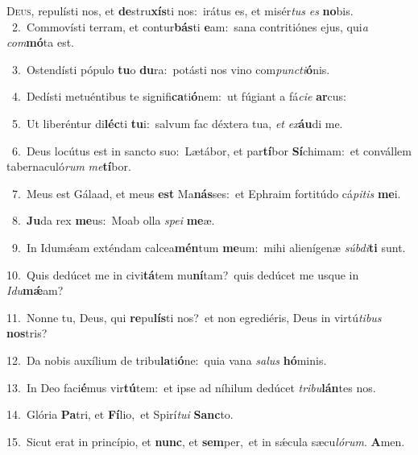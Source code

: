 \lettrine{\initial\textcolor{\initialcolor}{D}}{eus,} repulísti nos, et \textbf{de}\-stru\-\textbf{xís}\-ti nos:~\star irátus es, et misér\textit{tus} \textit{es} \textbf{no}\-bis.\\
{\numbfont\textcolor{\numbcolor}{~2.}}~Commovísti terram, et contur\-\textbf{bás}\-ti \textbf{e}\-am:~\star sana contritiónes ejus, qui\textit{a} \textit{com}\-\textbf{mó}ta est.\par
{\numbfont\textcolor{\numbcolor}{~3.}}~Ostendísti pópulo \textbf{tu}\-o \textbf{du}\-ra:~\star potásti nos vino com\-\textit{punc}\-\textit{ti}\textbf{ó}nis.\par
{\numbfont\textcolor{\numbcolor}{~4.}}~Dedísti metuéntibus te signifi\-\textbf{ca}\-ti\-\textbf{ó}\-nem:~\star ut fúgiant a fá\-\textit{ci}\-\textit{e} \textbf{ar}\-cus:\par
{\numbfont\textcolor{\numbcolor}{~5.}}~Ut liberéntur di\-\textbf{léc}\-ti \textbf{tu}\-i:~\star salvum fac déxtera tua, \textit{et} \textit{ex}\-\textbf{áu}di me.\par
{\numbfont\textcolor{\numbcolor}{~6.}}~Deus locútus est in sancto suo:~\dagger Lætábor, et par\-\textbf{tí}\-bor \textbf{Sí}\-chimam:~\star et convállem tabernaculó\textit{rum} \textit{me}\-\textbf{tí}bor.\par
{\numbfont\textcolor{\numbcolor}{~7.}}~Meus est Gálaad, et meus \textbf{est} Ma\-\textbf{nás}\-ses:~\star et Ephraim fortitúdo cá\-\textit{pi}\-\textit{tis} \textbf{me}\-i.\par
{\numbfont\textcolor{\numbcolor}{~8.}}~\-\textbf{Ju}\-da rex \textbf{me}\-us:~\star Moab olla \textit{spe}\-\textit{i} \textbf{me}\-æ.\par
{\numbfont\textcolor{\numbcolor}{~9.}}~In Idumǽam exténdam calcea\-\textbf{mén}\-tum \textbf{me}\-um:~\star mihi alienígenæ \textit{súb}\-\textit{di}\textbf{ti} sunt.\par
{\numbfont\textcolor{\numbcolor}{10.}}~Quis dedúcet me in civi\-\textbf{tá}\-tem mu\-\textbf{ní}\-tam?~\star quis dedúcet me usque in \textit{I}\-\textit{du}\textbf{mǽ}am?\par
{\numbfont\textcolor{\numbcolor}{11.}}~Nonne tu, Deus, qui \textbf{re}\-pu\-\textbf{lís}\-ti nos?~\star et non egrediéris, Deus in virtú\-\textit{ti}\-\textit{bus} \textbf{nos}\-tris?\par
{\numbfont\textcolor{\numbcolor}{12.}}~Da nobis auxílium de tribu\-\textbf{la}\-ti\-\textbf{ó}\-ne:~\star quia vana \textit{sa}\-\textit{lus} \textbf{hó}\-minis.\par
{\numbfont\textcolor{\numbcolor}{13.}}~In Deo faci\-\textbf{é}\-mus vir\-\textbf{tú}\-tem:~\star et ipse ad níhilum dedúcet \textit{tri}\-\textit{bu}\textbf{lán}tes nos.\par
{\numbfont\textcolor{\numbcolor}{14.}}~Glória \textbf{Pa}\-tri, et \textbf{Fí}\-lio,~\star et Spirí\-\textit{tu}\-\textit{i} \textbf{Sanc}\-to.\par
{\numbfont\textcolor{\numbcolor}{15.}}~Sicut erat in princípio, et \textbf{nunc}\-, et \textbf{sem}\-per,~\star et in sǽcula sæcu\-\textit{ló}\-\textit{rum}. \textbf{A}\-men.\par
